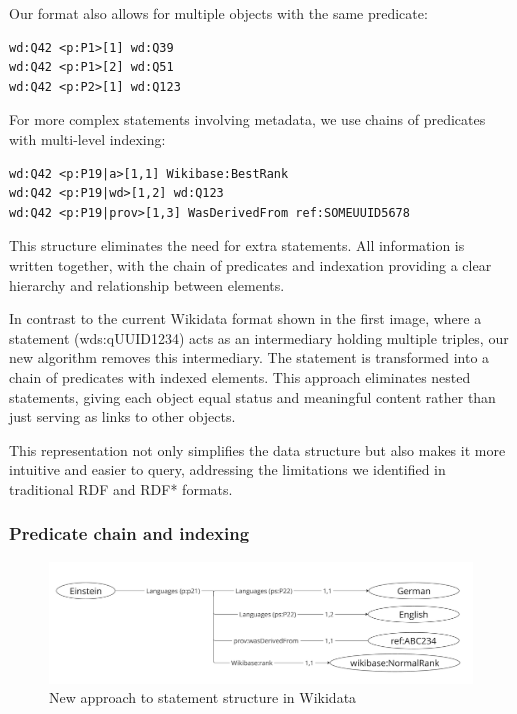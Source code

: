 Our format also allows for multiple objects with the same predicate:

{\footnotesize
\begin{verbatim}
wd:Q42 <p:P1>[1] wd:Q39
wd:Q42 <p:P1>[2] wd:Q51
wd:Q42 <p:P2>[1] wd:Q123
\end{verbatim}
}

For more complex statements involving metadata, we use chains of predicates with multi-level indexing:

{\footnotesize
\begin{verbatim}
wd:Q42 <p:P19|a>[1,1] Wikibase:BestRank
wd:Q42 <p:P19|wd>[1,2] wd:Q123
wd:Q42 <p:P19|prov>[1,3] WasDerivedFrom ref:SOMEUUID5678
\end{verbatim}
}

This structure eliminates the need for extra statements. All information is written together, with the chain of predicates and indexation providing a clear hierarchy and relationship between elements.

In contrast to the current Wikidata format shown in the first image, where a statement (wds:qUUID1234) acts as an intermediary holding multiple triples, our new algorithm removes this intermediary. The statement is transformed into a chain of predicates with indexed elements. This approach eliminates nested statements, giving each object equal status and meaningful content rather than just serving as links to other objects.

This representation not only simplifies the data structure but also makes it more intuitive and easier to query, addressing the limitations we identified in traditional RDF and RDF* formats.

\subsubsection{Predicate chain and indexing}

\begin{figure}[htbp]
    \centering
    \includegraphics[width=1\textwidth]{16.png}
    \caption{New approach to statement structure in Wikidata}
    \label{fig:image16}
\end{figure}

